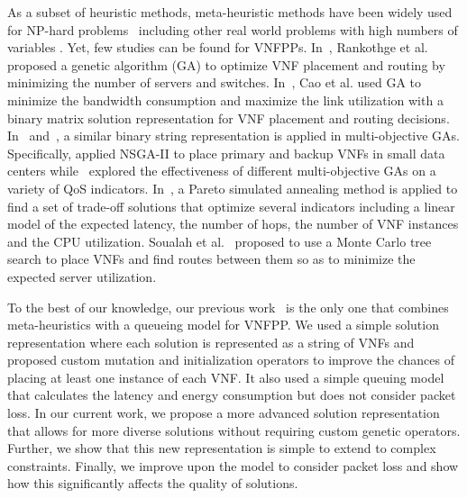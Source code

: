 As a subset of heuristic methods, meta-heuristic methods have been widely used for NP-hard problems~\cite{XueZB13,MavrovouniotisM17,YuanBTZLL17,ChenZLGGZYCLZ19,YoonK13} including other real world problems with high numbers of variables \cite{JiaMZ21,PengJW19,ChengJ15}. Yet, few studies can be found for VNFPPs. In~\cite{RankothgeMLRL15}, Rankothge et al. proposed a genetic algorithm (GA) to optimize VNF placement and routing by minimizing the number of servers and switches. In~\cite{CaoZACHS16}, Cao et al. used GA to minimize the bandwidth consumption and maximize the link utilization with a binary matrix solution representation for VNF placement and routing decisions. In~\cite{ChantreF20} and~\cite{KaurGK020}, a similar binary string representation is applied in multi-objective GAs. Specifically, \cite{ChantreF20} applied NSGA-II \cite{DebAPM02} to place primary and backup VNFs in small data centers while~\cite{KaurGK020} explored the effectiveness of different multi-objective GAs on a variety of QoS indicators. In~\cite{LangeGZTJ17}, a Pareto simulated annealing method is applied to find a set of trade-off solutions that optimize several indicators including a linear model of the expected latency, the number of hops, the number of VNF instances and the CPU utilization. Soualah et al.~\cite{SoualahMGZ17} proposed to use a Monte Carlo tree search to place VNFs and find routes between them so as to minimize the expected server utilization.

To the best of our knowledge, our previous work~\cite{BillingsleyLMMG19} is the only one that combines meta-heuristics with a queueing model for VNFPP. We used a simple solution representation where each solution is represented as a string of VNFs and proposed custom mutation and initialization operators to improve the chances of placing at least one instance of each VNF. It also used a simple queuing model that calculates the latency and energy consumption but does not consider packet loss. In our current work, we propose a more advanced solution representation that allows for more diverse solutions without requiring custom genetic operators. Further, we show that this new representation is simple to extend to complex constraints. Finally, we improve upon the model to consider packet loss and show how this significantly affects the quality of solutions.